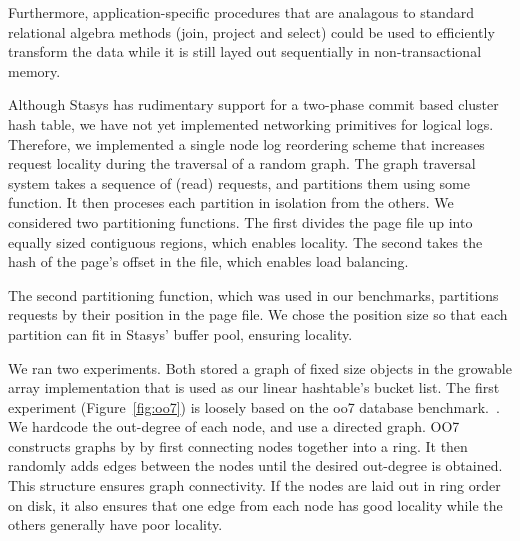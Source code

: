 \documentclass[letterpaper,twocolumn,10pt]{article}
\newcommand{\yad}{Stasys\xspace}
\newcommand{\yads}{Stasys'\xspace}
\begin{document}
Furthermore, application-specific
procedures that are analagous to standard relational algebra methods
(join, project and select) could be used to efficiently transform the data
while it is still layed out sequentially
in non-transactional memory.


Although \yad has rudimentary support for a two-phase commit based
cluster hash table, we have not yet implemented networking primitives for logical logs.
Therefore, we implemented a single node log reordering scheme that increases request locality
during the traversal of a random graph.  The graph traversal system
takes a sequence of (read) requests, and partitions them using some
function.  It then proceses each partition in isolation from the
others.  We considered two partitioning functions.  The first divides the page file
up into equally sized contiguous regions, which enables locality.  The second takes the hash
of the page's offset in the file, which enables load balancing.

The second partitioning function, which was used in our benchmarks,
partitions requests by their position in the page file.  We chose the
position size so that each partition can fit in \yads buffer pool,
ensuring locality.

We ran two experiments.  Both stored a graph of fixed size objects in
the growable array implementation that is used as our linear
hashtable's bucket list.
The first experiment (Figure~\ref{fig:oo7})
is loosely based on the oo7 database benchmark.~\cite{oo7}.  We
hardcode the out-degree of each node, and use a directed graph.  OO7
constructs graphs by by first connecting nodes together into a ring.
It then randomly adds edges between the nodes until the desired
out-degree is obtained.  This structure ensures graph connectivity.
If the nodes are laid out in ring order on disk, it also ensures that
one edge from each node has good locality while the others generally
have poor locality.
\end{document}
